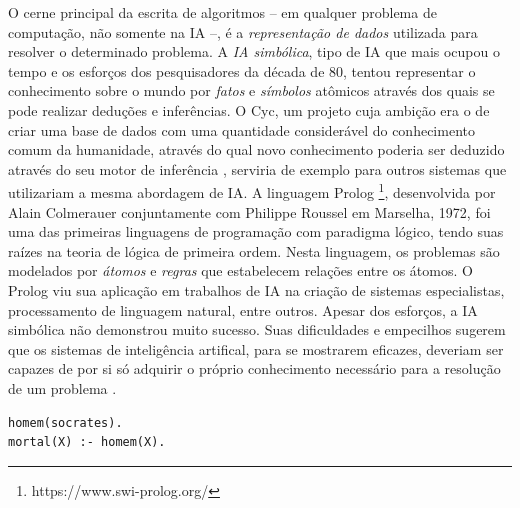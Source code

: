 \documentclass[12pt, a4paper]{article}
\begin{document}
O cerne principal da escrita de algoritmos -- em qualquer problema de computação, não somente na IA --, 
é a \emph{representação de dados} utilizada para resolver o determinado problema. A \emph{IA simbólica},
tipo de IA que mais ocupou o tempo e os esforços dos pesquisadores da década de 80, tentou representar o conhecimento
sobre o mundo por \emph{fatos} e \emph{símbolos} atômicos através dos quais se pode realizar deduções e inferências. 
O Cyc, um projeto cuja ambição era o de criar uma
base de dados com uma quantidade considerável do conhecimento comum da humanidade, através do qual
novo conhecimento poderia ser deduzido através do seu motor de inferência \cite{cyc}, serviria de exemplo para outros sistemas
que utilizariam a mesma abordagem de IA. A linguagem Prolog \footnote{https://www.swi-prolog.org/}, 
desenvolvida por Alain Colmerauer conjuntamente com Philippe Roussel em Marselha, 1972, 
foi uma das primeiras linguagens de programação com paradigma lógico, tendo suas raízes na teoria de lógica de primeira ordem.
Nesta linguagem, os problemas são modelados por \emph{átomos} e \emph{regras} que estabelecem relações entre os átomos.
O Prolog viu sua aplicação em trabalhos de IA na criação de sistemas especialistas, processamento de linguagem natural, entre outros. 
Apesar dos esforços, a IA simbólica não demonstrou muito sucesso. Suas dificuldades e empecilhos sugerem que os sistemas de inteligência
artifical, para se mostrarem eficazes, deveriam ser capazes de por si só adquirir o próprio conhecimento necessário
para a resolução de um problema \cite{Goodfellow-et-al-2016}.

\bigskip
\begin{lstlisting}[caption={Exemplo do uso da linguagem Prolog para modelar a famosa proposição da mortalidade de Sócrates.}, captionpos=b]
homem(socrates).
mortal(X) :- homem(X).
\end{lstlisting}
\end{document}
